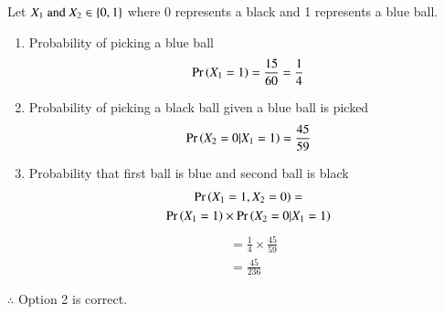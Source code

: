 
Let $X_1 \text{ and } X_2 \in \left\{0,1\right\}$ where 0 represents a black and 1 represents a blue ball.
\begin{enumerate}[label=\alph*)]
    \item Probability of picking a blue ball
      \begin{align}
        \Pr\left(X_1=1\right) = \frac{15}{60} = \frac{1}{4}
      \end{align}
    \item Probability of picking a black ball given a blue ball is picked
      \begin{align}
        \Pr\left(X_2=0|X_1=1\right) = \frac{45}{59}
      \end{align}
    \item Probability that first ball is blue and second ball is black
      \begin{multline}
        \Pr\left(X_1=1,X_2=0\right)= \\\Pr\left(X_1=1\right) \times \Pr\left(X_2=0|X_1=1\right) 
      \end{multline}
    \begin{align}
       &= \frac{1}{4} \times \frac{45}{59}\\ 
       &= \frac{45}{236} 
    \end{align}
\end{enumerate}
$\therefore$ Option 2 is correct.
